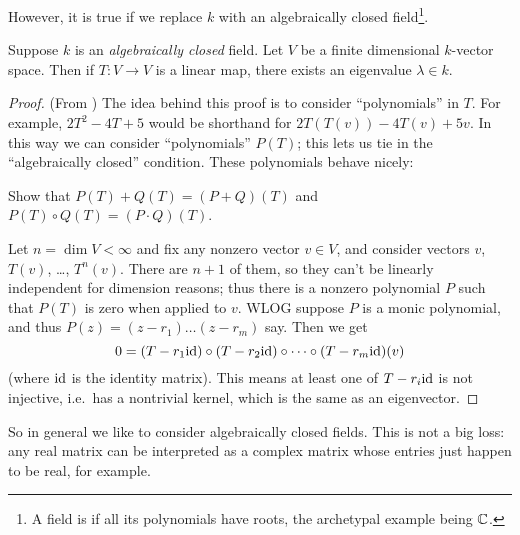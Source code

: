 However, it is true if we replace $k$ with an
algebraically closed field\footnote{A field is 
	if all its polynomials have roots,
	the archetypal example being $\mathbb C$.}.
\begin{theorem}
	Suppose $k$ is an \emph{algebraically closed} field.
	Let $V$ be a finite dimensional $k$-vector space.
	Then if $T \colon V \to V$ is a linear map,
	there exists an eigenvalue $\lambda \in k$.
\end{theorem}
\begin{proof}
	(From \cite{ref:axler})
	The idea behind this proof is to consider ``polynomials'' in $T$.
	For example, $2T^2-4T+5$ would be shorthand for $2T(T(v)) - 4T(v) + 5v$.
	In this way we can consider ``polynomials'' $P(T)$;
	this lets us tie in the ``algebraically closed'' condition.
	These polynomials behave nicely:
	\begin{ques}
		Show that $P(T)+Q(T) = (P+Q)(T)$ and $P(T) \circ Q(T) = (P \cdot Q)(T)$.
	\end{ques}

	Let $n = \dim V < \infty$ and fix any nonzero vector $v \in V$,
	and consider vectors $v$, $T(v)$, \dots, $T^n (v)$.
	There are $n+1$ of them,
	so they can't be linearly independent for dimension reasons;
	thus there is a nonzero polynomial $P$ such that $P(T)$
	is zero when applied to $v$.
	WLOG suppose $P$ is a monic polynomial,
	and thus $P(z) = (z-r_1)\dots(z-r_m)$ say.
	Then we get
	\[ 0 = (T - r_1 \mathrm{id}) \circ (T - r_2 \mathrm{id}) \circ \dots
		\circ (T - r_m \mathrm{id})(v) \]
	(where $\mathrm{id}$ is the identity matrix).  This means at least one of
	$T - r_i \mathrm{id}$ is not injective, i.e.\ has a nontrivial kernel,
	which is the same as an eigenvector.
\end{proof}
So in general we like to consider algebraically closed fields.
This is not a big loss:
any real matrix can be interpreted as a complex matrix
whose entries just happen to be real, for example.

